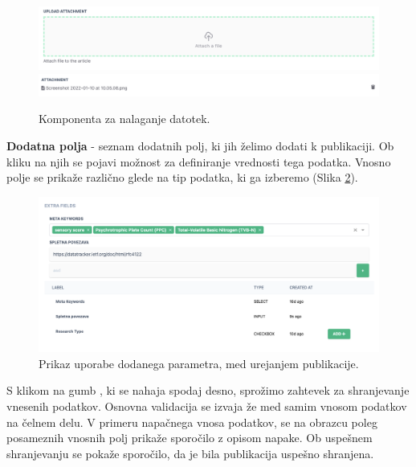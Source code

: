 \documentclass[a4paper, 12pt]{book}
\begin{document}
\begin{description}
    \begin{figure}[h]
    \begin{center}
        \includegraphics[width=1\textwidth]{slike/upload_file_zone.png}
        \includegraphics[width=1\textwidth]{slike/upload_file_list.png}
        \end{center}
        \caption{ Komponenta za nalaganje datotek. }
        \label{type-fileupload}
    \end{figure}
  
    \item \textbf{Dodatna polja} - seznam dodatnih polj, ki jih želimo dodati k publikaciji. Ob kliku na njih se pojavi možnost za definiranje vrednosti tega podatka. Vnosno polje se prikaže različno glede na tip podatka, ki ga izberemo (Slika \ref{fields-usage}).
    \begin{figure}[h]
        \begin{center}
        \includegraphics[width=1\textwidth]{slike/fields_usage.png}
        \end{center}
        \caption{ Prikaz uporabe dodanega parametra, med urejanjem publikacije. }
        \label{fields-usage}
    \end{figure}
   
\end{description}

S klikom na gumb , ki se nahaja spodaj desno, sprožimo zahtevek za shranjevanje vnesenih podatkov. Osnovna validacija se izvaja že med samim vnosom podatkov na čelnem delu. V primeru napačnega vnosa podatkov, se na obrazcu poleg posameznih vnosnih polj prikaže sporočilo z opisom napake. Ob uspešnem shranjevanju se pokaže sporočilo, da je bila publikacija uspešno shranjena. 
\end{document}
